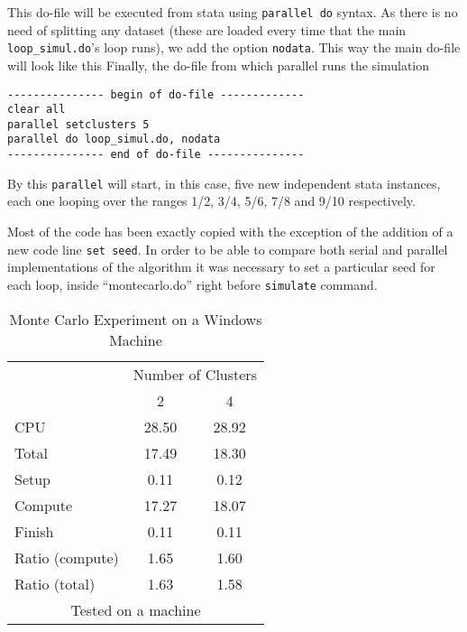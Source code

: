 \documentclass[letterpaper, 10pt]{article}
\begin{document}
\noindent This do-file will be executed from stata using {\tt parallel do} syntax. As there is no need of splitting any dataset (these are loaded every time that the main {\tt loop\_simul.do}'s loop runs), we add the option {\tt nodata}. This way the main do-file will look like this
Finally, the do-file from which parallel runs the simulation
\bigskip

\begin{Verbatim}[tabsize=4, fontsize=\footnotesize]
--------------- begin of do-file -------------
clear all
parallel setclusters 5
parallel do loop_simul.do, nodata
--------------- end of do-file ---------------
\end{Verbatim}
\bigskip

By this {\tt parallel} will start, in this case, five new independent stata instances, each one looping over the ranges 1/2, 3/4, 5/6, 7/8 and 9/10 respectively.

Most of the code has been exactly copied with the exception of the addition of a new code line {\tt set seed}. In order to be able to compare both serial and parallel implementations of the algorithm it was necessary to set a particular seed for each loop, inside ``montecarlo.do'' right before {\tt simulate} command.

\begin{table}[!h]
\centering
\caption{Monte Carlo Experiment on a Windows Machine}
\begin{tabular}{l*{2}{c}}\hline
& \multicolumn{2}{c}{Number of Clusters} \\
& 2 &               4 \\ \hline
CPU &    28.50 &     28.92 \\
Total &    17.49 &     18.30 \\
\hspace{2mm} Setup &     0.11 &      0.12 \\
\hspace{2mm} Compute &    17.27 &     18.07 \\
\hspace{2mm} Finish &     0.11 &      0.11 \\
\hline Ratio (compute) &     1.65 &      1.60 \\
Ratio (total) &     1.63 &      1.58 \\
\hline
\multicolumn{3}{c}{\footnotesize Tested on a \win1 machine}
\end{tabular}
\end{table}
\end{document}
